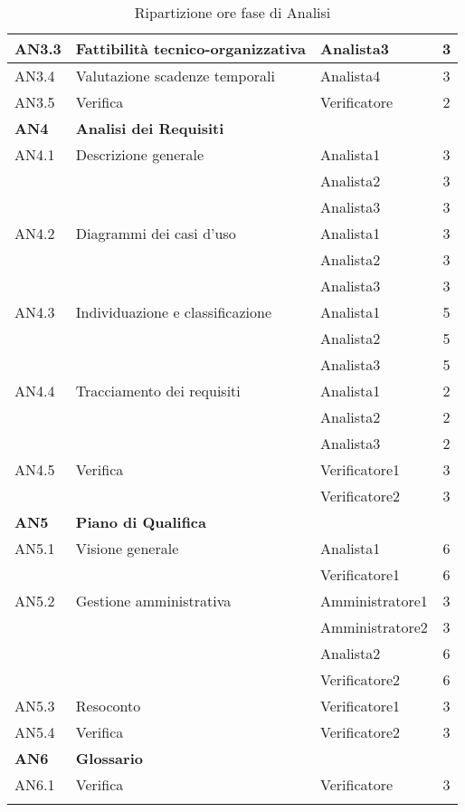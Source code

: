 \begin{longtable}{|l|l|l|c|}
      	{AN3.3} & {Fattibilità tecnico-organizzativa} & Analista3  & 3 \\
      	\hline
      	{AN3.4} & {Valutazione scadenze temporali} & Analista4  & 3 \\
      	\hline
      	{AN3.5} & {Verifica} & Verificatore  & 2 \\
      \hline
      \textbf{AN4} & \textbf{Analisi dei Requisiti} & &  \\
         \hline
         {AN4.1} & {Descrizione generale} & Analista1  &  3\\
         & & Analista2 & 3\\
         & & Analista3 & 3\\
         \hline
         {AN4.2} & {Diagrammi dei casi d'uso} & Analista1  &  3\\
         & & Analista2 & 3\\
         & & Analista3 & 3\\
         \hline
         {AN4.3} & {Individuazione e classificazione} & Analista1  &  5\\
         & & Analista2 & 5\\
         & & Analista3 & 5\\
         \hline
         {AN4.4} & {Tracciamento dei requisiti} & Analista1  &  2\\
         & & Analista2 & 2\\
         & & Analista3 & 2\\
         \hline
         {AN4.5} & {Verifica} & Verificatore1  &  3\\
         & & Verificatore2 & 3\\
     \hline
     \textbf{AN5} & \textbf{Piano di Qualifica} & &  \\
         \hline
         {AN5.1} & {Visione generale} & Analista1 &  6 \\
         & & Verificatore1 & 6\\
         \hline
         {AN5.2} & {Gestione amministrativa} & Amministratore1  &  3\\
         & & Amministratore2 & 3\\
         & & Analista2 & 6\\
         & & Verificatore2 & 6\\
         \hline
         {AN5.3} & {Resoconto} & Verificatore1 &  3\\
         \hline
         {AN5.4} & {Verifica} & Verificatore2 &  3 \\
     \hline
     \textbf{AN6} & \textbf{Glossario} & &  \\
         \hline
         {AN6.1} & {Verifica} & Verificatore &  3 \\
         \hline
     \caption{Ripartizione ore fase di Analisi}
\end{longtable}
\egroup
  
